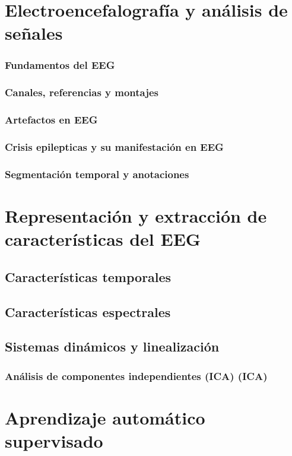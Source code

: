 \section{Electroencefalografía y análisis de señales}

\subsubsection{Fundamentos del EEG}
\subsubsection{Canales, referencias y montajes}
\subsubsection{Artefactos en EEG}
\subsubsection{Crisis epilepticas y su manifestación en EEG}
\subsubsection{Segmentación temporal y anotaciones}

\section{Representación y extracción de características del EEG}
\subsection{Características temporales}
\subsection{Características espectrales}
\subsection{Sistemas dinámicos y linealización}
\subsubsection{Análisis de componentes independientes (ICA) (ICA)}\label{Marcoteorico_ICA}

\section{Aprendizaje automático supervisado}
